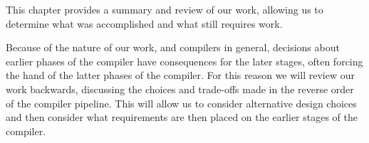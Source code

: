 This chapter provides a summary and review of our work, allowing us to
determine what was accomplished and what still requires work.

Because of the nature of our work, and compilers in general, decisions
about earlier phases of the compiler have consequences for the later
stages, often forcing the hand of the latter phases of the compiler.
For this reason we will review our work backwards, discussing the choices
and trade-offs made in the reverse order of the compiler pipeline. This will
allow us to consider alternative design choices and then consider what
requirements are then placed on the earlier stages of the compiler.
